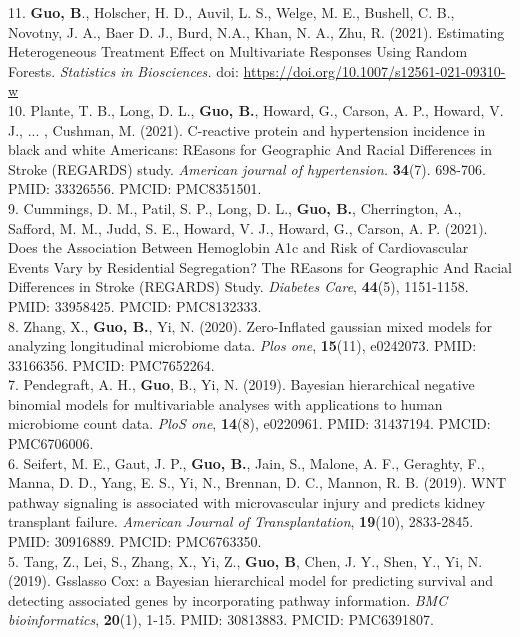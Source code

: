 11. {\bf Guo, B}., Holscher, H. D., Auvil, L. S., Welge, M. E., Bushell, C. B., Novotny, J. A., Baer D. J., Burd, N.A., Khan, N. A., Zhu, R. (2021). Estimating Heterogeneous Treatment Effect on Multivariate Responses Using Random Forests. {\it Statistics in Biosciences.} doi: \url{https://doi.org/10.1007/s12561-021-09310-w}\\

10. Plante, T. B., Long, D. L., \textbf{Guo, B.}, Howard, G., Carson, A. P., Howard, V. J., ... , Cushman, M. (2021). C-reactive protein and hypertension incidence in black and white Americans: REasons for Geographic And Racial Differences in Stroke (REGARDS) study. \textit{American journal of hypertension.} {\bf 34}(7). 698-706. PMID: 33326556. PMCID: PMC8351501. \\

9. Cummings, D. M., Patil, S. P., Long, D. L., {\bf Guo, B.}, Cherrington, A., Safford, M. M., Judd, S. E., Howard, V. J., Howard, G., Carson, A. P. (2021). Does the Association Between Hemoglobin A1c and Risk of Cardiovascular Events Vary by Residential Segregation? The REasons for Geographic And Racial Differences in Stroke (REGARDS) Study. {\it Diabetes Care}, {\bf 44}(5), 1151-1158. PMID: 33958425. PMCID: PMC8132333.\\

8. Zhang, X., {\bf Guo, B.}, Yi, N. (2020). Zero-Inflated gaussian mixed models for analyzing longitudinal microbiome data. {\it Plos one}, {\bf 15}(11), e0242073. PMID: 33166356. PMCID: PMC7652264.\\

7. Pendegraft, A. H., {\bf Guo}, B., Yi, N. (2019). Bayesian hierarchical negative binomial models for multivariable analyses with applications to human microbiome count data. {\it PloS one}, {\bf 14}(8), e0220961. PMID: 31437194. PMCID: PMC6706006.\\

6. Seifert, M. E., Gaut, J. P., {\bf Guo, B.}, Jain, S., Malone, A. F., Geraghty, F., Manna, D. D., Yang, E. S., Yi, N., Brennan, D. C., Mannon, R. B. (2019). WNT pathway signaling is associated with microvascular injury and predicts kidney transplant failure. {\it American Journal of Transplantation}, {\bf 19}(10), 2833-2845. PMID: 30916889. PMCID: PMC6763350. \\

5. Tang, Z., Lei, S., Zhang, X., Yi, Z.,  {\bf Guo, B}, Chen, J. Y., Shen, Y.,  Yi, N. (2019). Gsslasso Cox: a Bayesian hierarchical model for predicting survival and detecting associated genes by incorporating pathway information. {\it BMC bioinformatics}, {\bf 20}(1), 1-15. PMID: 30813883. PMCID: PMC6391807.\\

